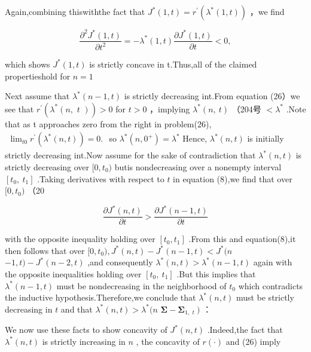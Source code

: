Again,combining thiswiththe fact that
\(J ^ { * } ( 1 , t ) = r ^ { \prime } ( \lambda ^ { * } ( 1 , t ) )\)
，we find

\[
\frac { \partial ^ { 2 } J ^ { * } ( 1 , t ) } { \partial t ^ { 2 } } = - \lambda ^ { * } ( 1 , t ) \frac { \partial J ^ { * } ( 1 , t ) } { \partial t } < 0 ,
\]

which shows \(J ^ { * } ( 1 , t )\) is strictly concave in t.Thus,all of
the claimed propertieshold for \(n = 1\)

Next assume that \(\lambda ^ { * } ( n - 1 , t )\) is strictly
decreasing int.From equation (26）we see that
\(r ^ { \prime } ( \lambda ^ { * } ( n , \textit { t } ) ) > 0\) for
\(t > 0\) ，implying \(\lambda ^ { * } ( n , \ t )\) （204号
\(< \lambda ^ { * }\) .Note that as t approaches zero from the right in
problem(26),
\(\begin{array} { r } { \operatorname* { l i m } _ { t  0 } r ^ { \prime } ( \lambda ^ { * } ( n , t ) ) = 0 . } \end{array}\)
so \(\lambda ^ { * } ( n , 0 ^ { + } ) = \lambda ^ { * }\) Hence,
\(\lambda ^ { * } ( n , t )\) is initially strictly decreasing int.Now
assume for the sake of contradiction that \(\lambda ^ { * } ( n , t )\)
is strictly decreasing over \([ 0 , t _ { 0 } )\) butis nondecreasing
over a nonempty interval \(\left[ t _ { 0 } , \ t _ { 1 } \right]\)
.Taking derivatives with respect to \(t\) in equation (8),we find that
over \([ 0 , t _ { 0 } )\) （20

\[
\frac { \partial J ^ { * } ( n , t ) } { \partial t } > \frac { \partial J ^ { * } ( n - 1 , t ) } { \partial t }
\]

with the opposite inequality holding over
\(\left[ t _ { 0 } , t _ { 1 } \right]\) .From this and equation(8),it
then follows that over
\([ 0 , t _ { 0 } ) , J ^ { * } ( n , t ) - J ^ { * } ( n - 1 , t ) < J ^ { * } ( n\)
\(- 1 , t ) - J ^ { * } ( n - 2 , t )\) ,and consequently
\(\lambda ^ { * } ( n , t ) > \lambda ^ { * } ( n - 1 , t )\) again with
the opposite inequalities holding over
\(\left[ t _ { 0 } , \ t _ { 1 } \right]\) .But this implies that
\(\lambda ^ { * } ( n - 1 , t )\) must be nondecreasing in the
neighborhood of \(t _ { 0 }\) which contradicts the inductive
hypothesis.Therefore,we conclude that \(\lambda ^ { * } ( n , t )\) must
be strictly decreasing in \(t\) and that
\(\lambda ^ { * } ( n , t ) > \lambda ^ { * } ( n\)
\(\mathbf { \Sigma } - \mathbf { \Sigma } _ { 1 , \textit { t } } )\) ：

We now use these facts to show concavity of \(J ^ { * } ( n , t )\)
.Indeed,the fact that \(\lambda ^ { * } ( n , t )\) is strictly
increasing in \(n\) , the concavity of \(r ( \cdot )\) and (26) imply

